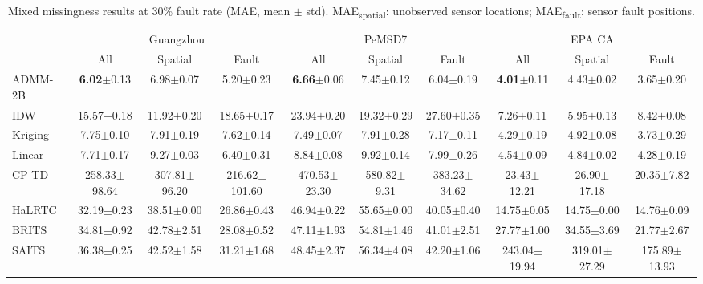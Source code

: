 \begin{table}[htbp]
  \centering
  \caption{Mixed missingness results at 30\% fault rate (MAE, mean $\pm$ std). MAE\textsubscript{spatial}: unobserved sensor locations; MAE\textsubscript{fault}: sensor fault positions.}
  \label{tab:exp5_detail}
  \small
  \begin{tabular}{lccccccccc}
    \toprule
    & \multicolumn{3}{c}{Guangzhou} & \multicolumn{3}{c}{PeMSD7} & \multicolumn{3}{c}{EPA CA} \\
    \cmidrule(lr){2-4} \cmidrule(lr){5-7} \cmidrule(lr){8-10}
    & All & Spatial & Fault & All & Spatial & Fault & All & Spatial & Fault \\
    \midrule
    ADMM-2B & \textbf{6.02}$\pm$0.13 & 6.98$\pm$0.07 & 5.20$\pm$0.23 & \textbf{6.66}$\pm$0.06 & 7.45$\pm$0.12 & 6.04$\pm$0.19 & \textbf{4.01}$\pm$0.11 & 4.43$\pm$0.02 & 3.65$\pm$0.20 \\
    IDW & 15.57$\pm$0.18 & 11.92$\pm$0.20 & 18.65$\pm$0.17 & 23.94$\pm$0.20 & 19.32$\pm$0.29 & 27.60$\pm$0.35 & 7.26$\pm$0.11 & 5.95$\pm$0.13 & 8.42$\pm$0.08 \\
    Kriging & 7.75$\pm$0.10 & 7.91$\pm$0.19 & 7.62$\pm$0.14 & 7.49$\pm$0.07 & 7.91$\pm$0.28 & 7.17$\pm$0.11 & 4.29$\pm$0.19 & 4.92$\pm$0.08 & 3.73$\pm$0.29 \\
    Linear & 7.71$\pm$0.17 & 9.27$\pm$0.03 & 6.40$\pm$0.31 & 8.84$\pm$0.08 & 9.92$\pm$0.14 & 7.99$\pm$0.26 & 4.54$\pm$0.09 & 4.84$\pm$0.02 & 4.28$\pm$0.19 \\
    CP-TD & 258.33$\pm$98.64 & 307.81$\pm$96.20 & 216.62$\pm$101.60 & 470.53$\pm$23.30 & 580.82$\pm$9.31 & 383.23$\pm$34.62 & 23.43$\pm$12.21 & 26.90$\pm$17.18 & 20.35$\pm$7.82 \\
    HaLRTC & 32.19$\pm$0.23 & 38.51$\pm$0.00 & 26.86$\pm$0.43 & 46.94$\pm$0.22 & 55.65$\pm$0.00 & 40.05$\pm$0.40 & 14.75$\pm$0.05 & 14.75$\pm$0.00 & 14.76$\pm$0.09 \\
    BRITS & 34.81$\pm$0.92 & 42.78$\pm$2.51 & 28.08$\pm$0.52 & 47.11$\pm$1.93 & 54.81$\pm$1.46 & 41.01$\pm$2.51 & 27.77$\pm$1.00 & 34.55$\pm$3.69 & 21.77$\pm$2.67 \\
    SAITS & 36.38$\pm$0.25 & 42.52$\pm$1.58 & 31.21$\pm$1.68 & 48.45$\pm$2.37 & 56.34$\pm$4.08 & 42.20$\pm$1.06 & 243.04$\pm$19.94 & 319.01$\pm$27.29 & 175.89$\pm$13.93 \\
    \bottomrule
  \end{tabular}
\end{table}